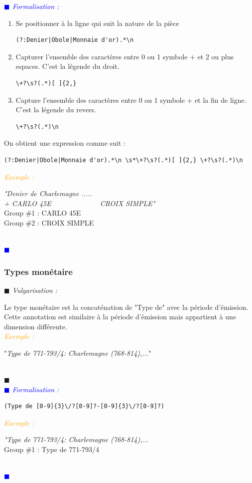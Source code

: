 \documentclass[a4paper, 11pt]{report}
\newenvironment{vulgarisation}
    {
    \textit{\textcolor{dark-blue}{$\blacksquare$  Vulgarisation : \\}}

    }
    {
    ~\\\textcolor{dark-blue}{$\blacksquare$}\\
    }
\newenvironment{formalisation}
    {
    \textit{\textcolor{blue}{$\blacksquare$  Formalisation : \\}}
    }
    {
    ~\\\textcolor{blue}{$\blacksquare$}\\
    }
\newenvironment{exemple}
    {
    \textit{\textcolor{orange}{
    Exemple : \\}}
    }
    {\\
    }
\begin{document}
\begin{formalisation}
	\begin{enumerate}
		\item Se positionner à la ligne qui suit la nature de la pièce
		      \begin{verbatim}
(?:Denier|Obole|Monnaie d'or).*\n
		\end{verbatim}
		\item Capturer l'ensemble des caractères entre 0 ou 1 symbole + et 2 ou plus espaces. C'est la légende du droit.
		      \begin{verbatim}
\+?\s?(.*)[ ]{2,}
		\end{verbatim}
		\item Capture l'ensemble des caractères entre 0 ou 1 symbole + et la fin de ligne. C'est la légende du revers.
		      \begin{verbatim}
\+?\s?(.*)\n
		\end{verbatim}
	\end{enumerate}
	
	On obtient une expression comme suit : 
	\begin{verbatim}
(?:Denier|Obole|Monnaie d'or).*\n \s*\+?\s?(.*)[ ]{2,} \+?\s?(.*)\n
	\end{verbatim}
	
	\begin{exemple}
		\emph{"Denier de Charlemagne ..... \\+ CARLO  45E~~~~~~~~~~~~~ CROIX SIMPLE"}\\
		Group \#1 : CARLO  45E \\
		Group \#2 : CROIX SIMPLE
	\end{exemple}
\end{formalisation}

\subsubsection{Types monétaire}
\begin{vulgarisation}
	Le type monétaire est la concaténation de "Type de" avec la période d'émission. Cette annotation est similaire à la période d'émission mais appartient à une dimension différente.\\
	\begin{exemple}
		"\emph{Type de 771-793/4: Charlemagne (768-814),...}"
	\end{exemple}
\end{vulgarisation}
\begin{formalisation}
	\begin{verbatim}
(Type de [0-9]{3}\/?[0-9]?-[0-9]{3}\/?[0-9]?)
	\end{verbatim}
	\begin{exemple}
		\emph{"Type de 771-793/4: Charlemagne (768-814),...}\\
		Group \#1 : Type de 771-793/4 
	\end{exemple}
\end{formalisation}
\end{document}

